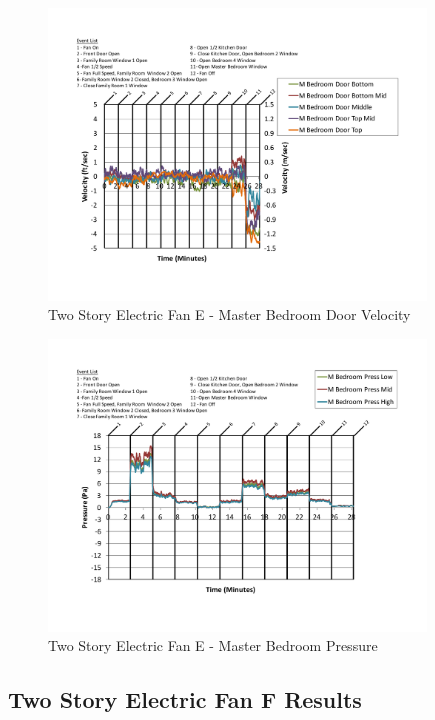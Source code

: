 \documentclass{article}
\begin{document}
\begin{appendices}
	\begin{figure}[H]
		\centering
		\includegraphics[height=3.05in,trim=0.67in 1.1in 0.67in 0.8in,clip=true]{0_Images/Results_Charts/ColdFlow/Two_Story/Electric/E/Master_Bedroom_Door_Velocity.pdf}
		\caption{Two Story Electric Fan E - Master Bedroom Door Velocity}
	\end{figure}
 

	\begin{figure}[H]
		\centering
		\includegraphics[height=3.05in,trim=0.67in 1.1in 0.67in 0.8in,clip=true]{0_Images/Results_Charts/ColdFlow/Two_Story/Electric/E/Master_Bedroom_Pressure.pdf}
		\caption{Two Story Electric Fan E - Master Bedroom Pressure}
	\end{figure}
 
	\clearpage

		\clearpage
\clearpage		\large
\subsection{Two Story Electric Fan F Results} \label{App:Two_StoryElectricFanFResults} 


\end{appendices}
\end{document}
